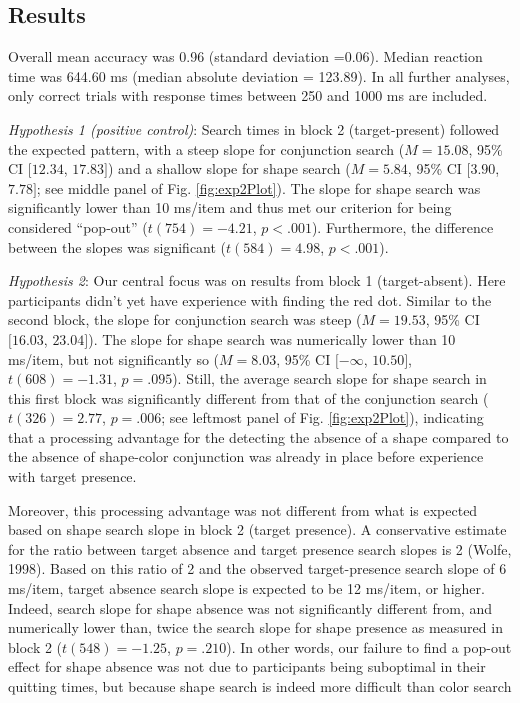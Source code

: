 \documentclass[
  english,
  man]{apa6}
\begin{document}
\hypertarget{results-1}{%
\subsection{Results}\label{results-1}}

Overall mean accuracy was 0.96 (standard deviation =0.06). Median reaction time was 644.60 ms (median absolute deviation = 123.89). In all further analyses, only correct trials with response times between 250 and 1000 ms are included.

\emph{Hypothesis 1 (positive control)}: Search times in block 2 (target-present) followed the expected pattern, with a steep slope for conjunction search (\(M = 15.08\), 95\% CI \([12.34\), \(17.83]\)) and a shallow slope for shape search (\(M = 5.84\), 95\% CI \([3.90\), \(7.78]\); see middle panel of Fig. \ref{fig:exp2Plot}). The slope for shape search was significantly lower than 10 ms/item and thus met our criterion for being considered \enquote{pop-out} (\(t(754) = -4.21\), \(p < .001\)). Furthermore, the difference between the slopes was significant (\(t(584) = 4.98\), \(p < .001\)).

\emph{Hypothesis 2}: Our central focus was on results from block 1 (target-absent). Here participants didn't yet have experience with finding the red dot. Similar to the second block, the slope for conjunction search was steep (\(M = 19.53\), 95\% CI \([16.03\), \(23.04]\)). The slope for shape search was numerically lower than 10 ms/item, but not significantly so (\(M = 8.03\), 95\% CI \([-\infty\), \(10.50]\), \(t(608) = -1.31\), \(p = .095\)). Still, the average search slope for shape search in this first block was significantly different from that of the conjunction search (\(t(326) = 2.77\), \(p = .006\); see leftmost panel of Fig. \ref{fig:exp2Plot}), indicating that a processing advantage for the detecting the absence of a shape compared to the absence of shape-color conjunction was already in place before experience with target presence.

Moreover, this processing advantage was not different from what is expected based on shape search slope in block 2 (target presence). A conservative estimate for the ratio between target absence and target presence search slopes is 2 (Wolfe, 1998). Based on this ratio of 2 and the observed target-presence search slope of 6 ms/item, target absence search slope is expected to be 12 ms/item, or higher. Indeed, search slope for shape absence was not significantly different from, and numerically lower than, twice the search slope for shape presence as measured in block 2 (\(t(548) = -1.25\), \(p = .210\)). In other words, our failure to find a pop-out effect for shape absence was not due to participants being suboptimal in their quitting times, but because shape search is indeed more difficult than color search
\end{document}
